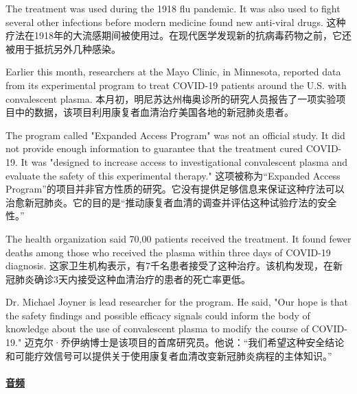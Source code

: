 The treatment was used during the 1918 flu pandemic. It was also used to fight several other infections before modern medicine found new anti-viral drugs.
这种疗法在1918年的大流感期间被使用过。在现代医学发现新的抗病毒药物之前，它还被用于抵抗另外几种感染。

Earlier this month, researchers at the Mayo Clinic, in Minnesota, reported data from its experimental program to treat COVID-19 patients around the U.S. with convalescent plasma.
本月初，明尼苏达州梅奥诊所的研究人员报告了一项实验项目中的数据，该项目利用康复者血清治疗美国各地的新冠肺炎患者。

The program called "Expanded Access Program" was not an official study. It did not provide enough information to guarantee that the treatment cured COVID-19. It was "designed to increase access to investigational convalescent plasma and evaluate the safety of this experimental therapy."
这项被称为“Expanded Access Program”的项目并非官方性质的研究。它没有提供足够信息来保证这种疗法可以治愈新冠肺炎。它的目的是“推动康复者血清的调查并评估这种试验疗法的安全性。”

The health organization said 70,00 patients received the treatment. It found fewer deaths among those who received the plasma within three days of COVID-19 diagnosis.
这家卫生机构表示，有7千名患者接受了这种治疗。该机构发现，在新冠肺炎确诊3天内接受这种血清治疗的患者的死亡率更低。

Dr. Michael Joyner is lead researcher for the program. He said, "Our hope is that the safety findings and possible efficacy signals could inform the body of knowledge about the use of convalescent plasma to modify the course of COVID-19."
迈克尔·乔伊纳博士是该项目的首席研究员。他说：“我们希望这种安全结论和可能疗效信号可以提供关于使用康复者血清改变新冠肺炎病程的主体知识。”
\paragraph{\href{https://files.21voa.com/202008/covid-19-plasma-a-breakthrough-or-an-experiment.mp3}{音频}}

